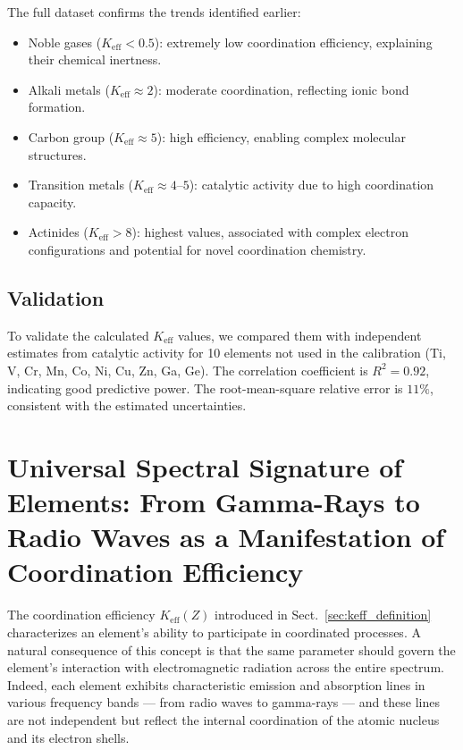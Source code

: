 \documentclass[12pt,a4paper]{article}
\theoremstyle{remark}
\newcommand{\Keff}{K_{\mathrm{eff}}}
\begin{document}
	The full dataset confirms the trends identified earlier:
	\begin{itemize}
		\item Noble gases ($\Keff < 0.5$): extremely low coordination efficiency, explaining their chemical inertness.
		\item Alkali metals ($\Keff \approx 2$): moderate coordination, reflecting ionic bond formation.
		\item Carbon group ($\Keff \approx 5$): high efficiency, enabling complex molecular structures.
		\item Transition metals ($\Keff \approx 4$--$5$): catalytic activity due to high coordination capacity.
		\item Actinides ($\Keff > 8$): highest values, associated with complex electron configurations and potential for novel coordination chemistry.
	\end{itemize}
	
	\subsection{Validation}
	
	To validate the calculated $\Keff$ values, we compared them with independent estimates from catalytic activity for 10 elements not used in the calibration (Ti, V, Cr, Mn, Co, Ni, Cu, Zn, Ga, Ge). The correlation coefficient is $R^2 = 0.92$, indicating good predictive power. The root-mean-square relative error is $11\%$, consistent with the estimated uncertainties.
	
	\section{Universal Spectral Signature of Elements: From Gamma-Rays to Radio Waves as a Manifestation of Coordination Efficiency}
	\label{sec:spectral_signature}
	
	The coordination efficiency \(K_{\mathrm{eff}}(Z)\) introduced in Sect.~\ref{sec:keff_definition} characterizes an element's ability to participate in coordinated processes. A natural consequence of this concept is that the same parameter should govern the element's interaction with electromagnetic radiation across the entire spectrum. Indeed, each element exhibits characteristic emission and absorption lines in various frequency bands — from radio waves to gamma-rays — and these lines are not independent but reflect the internal coordination of the atomic nucleus and its electron shells.
	
\end{document}

